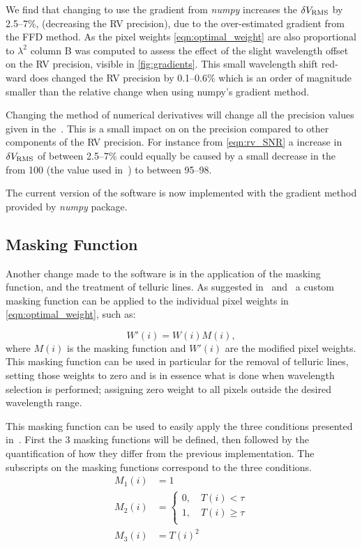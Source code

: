{We find that changing to use the gradient from \emph{numpy} increases the \(\delta V_{\textrm{RMS}}\) by 2.5--7\%, (decreasing the {RV} precision), due to the over-estimated gradient from the {FFD} method.
As the pixel weights \cref{eqn:optimal_weight} are also proportional to \({\lambda}^{2}\) column B was computed to assess the effect of the slight wavelength offset on the {RV} precision, visible in \cref{fig:gradients}.
This small wavelength shift red-ward does changed the {RV} precision by 0.1--0.6\% which is an order of magnitude smaller than the relative change when using numpy's gradient method.

Changing the method of numerical derivatives will change all the precision values given in the~\citet{figueira_radial_2016}.
This is a small impact on on the precision compared to other components of the {RV} precision.
For instance from \cref{eqn:rv_SNR} a increase in \(\delta V_{\textrm{RMS}}\) of between 2.5--7\%  could equally be caused by a small decrease in the \snr{} from 100 (the value used in~\citet{figueira_radial_2016}) to between 95--98.

The current version of the software is now implemented with the gradient method provided by \emph{numpy} package.

\subsection{Masking Function}
\label{subsec:masking_function}
Another change made to the software is in the application of the masking function, and the treatment of telluric lines.
As suggested in~\citet{connes_absolute_1985} and~\citet{bouchy_fundamental_2001} a custom masking function can be applied to the individual pixel weights in \cref{eqn:optimal_weight}, such as:

\[W'(i) = W(i)M(i),\label{eqn:mask_function}\] where \(M(i)\) is the masking function and \(W'(i)\) are the modified pixel weights.
This masking function can be used in particular for the removal of telluric lines, setting those weights to zero and is in essence what is done when wavelength selection is performed; assigning zero weight to all pixels outside the desired wavelength range.

This masking function can be used to easily apply the three conditions presented in~\citet{figueira_radial_2016}.
First the 3 masking functions will be defined, then followed by the quantification of how they differ from the previous implementation.
The subscripts on the masking functions correspond to the three conditions.
\begin{align}
M_1(i) &= 1 \label{eqn:mask1}\\
M_2(i) &= \begin{cases}
0, \hspace{1em} T(i) < \tau\\
1, \hspace{1em} T(i) \ge \tau\\
\end{cases}\label{eqn:mask2}\\
M_3(i) &= {T(i)}^{2} \label{eqn:mask3}
\end{align}

}
